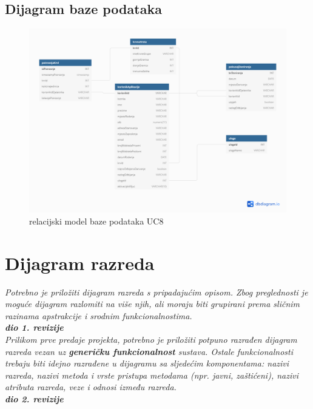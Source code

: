 			\subsection{Dijagram baze podataka}
				\begin{figure}[H]
	\centering
	\includegraphics[width=\textwidth, scale=2.0]{dijagrami/relShema.png}
	\caption{relacijski model baze podataka UC8}
	\label{fig:dijagram_baze}
\end{figure}
			\eject
			
		\section{Dijagram razreda}
		
			\textit{Potrebno je priložiti dijagram razreda s pripadajućim opisom. Zbog preglednosti je moguće dijagram razlomiti na više njih, ali moraju biti grupirani prema sličnim razinama apstrakcije i srodnim funkcionalnostima.}\\
			
			\textbf{\textit{dio 1. revizije}}\\
			
			\textit{Prilikom prve predaje projekta, potrebno je priložiti potpuno razrađen dijagram razreda vezan uz \textbf{generičku funkcionalnost} sustava. Ostale funkcionalnosti trebaju biti idejno razrađene u dijagramu sa sljedećim komponentama: nazivi razreda, nazivi metoda i vrste pristupa metodama (npr. javni, zaštićeni), nazivi atributa razreda, veze i odnosi između razreda.}\\
			
			\textbf{\textit{dio 2. revizije}}\\			
			
